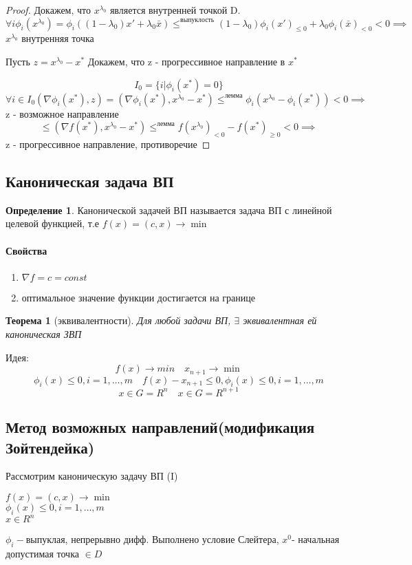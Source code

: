 \documentclass[a4paper]{article}
\newtheorem{theorem}{Теорема}[section]
\theoremstyle{definition}
\newtheorem*{definition}{Определение}
\theoremstyle{remark}
\begin{document}
\begin{proof}
    Докажем, что $x^{\lambda_0}$ является внутренней точкой D.
    \[\forall i \phi_i(x^{\lambda_0}) = \phi_i((1-\lambda_0)x' + \lambda_0\bar{x})\le^{\text{выпуклость}} (1-\lambda_0)\phi_i(x')_{\le 0} + \lambda_0\phi_i(\bar{x})_{< 0} < 0\implies\]
    $x^{\lambda_0}$ внутренняя точка

    Пусть $z = x^{\lambda_0} - x^*$ 
    Докажем, что z - прогрессивное направление в $x^*$
    
    \[I_0 = \{i | \phi_i(x^*) = 0\}\]
    \[\forall i\in I_0 (\nabla \phi_i(x^*), z) = (\nabla \phi_i(x^*), x^{\lambda_0}-x^*)\le^{\text{лемма}} \phi_i(x^{\lambda_0} - \phi_i(x^*)) < 0 \implies\]
    z - возможное направление \[\leq (\nabla f(x^*), x^{\lambda_0} - x^*) \le^{\text{лемма}} f(x^{\lambda_0})_{<0} - f(x^*)_{\ge 0} < 0\implies\]
    z  - прогрессивное направление, противоречие
\end{proof}
    \subsection{Каноническая задача ВП}
    \begin{definition}
        Канонической задачей ВП называется задача ВП с линейной целевой функцией, т.е $f(x) = (c, x)\to \min$
    \end{definition}
    \paragraph*{Свойства}
    \begin{enumerate}
        \item $\nabla f = c = const$
        \item оптимальное значение функции достигается на границе
    \end{enumerate}

\begin{theorem}[эквивалентности]
    Для любой задачи ВП, $\exists$ эквивалентная ей каноническая ЗВП
\end{theorem}
Идея:
\[f(x) \to min \quad x_{n+1} \to \min\]
\[\phi_i(x)\le 0 , i = 1, \dots, m \quad f(x) - x_{n+1} \le 0, \phi_i(x)\le 0 , i = 1, \dots, m\]
\[x\in G = R^n \quad x\in G = R^{n+1}\]

\newpage
\subsection{Метод возможных направлений(модификация Зойтендейка)}
Рассмотрим каноническую задачу ВП (I)
\begin{center}
    \(f(x) = (c, x) \to \min\) \\
    \(\phi_i(x) \le 0, i = 1, \dots, m\)\\
    \(x \in R^n\)
\end{center}
$\phi_i - $выпуклая, непрерывно дифф.
Выполнено условие Слейтера, $x^0$- начальная допустимая точка $\in D$
\end{document}
